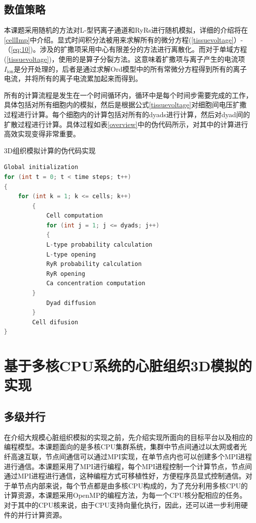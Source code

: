 \subsection{数值策略}
本课题采用随机的方法对L-型钙离子通道和RyRs进行随机模拟，详细的介绍将在\ref{cellImp}中介绍。显式时间积分法被用来求解所有的微分方程(\ref{tissuevoltage}）-（\ref{eq:10})。涉及的扩撒项采用中心有限差分的方法进行离散化。而对于单域方程(\ref{tissuevoltage})，使用的是算子分裂方法。这意味着扩撒项与离子产生的电流项$I_\mathrm{ion}$是分开处理的，后者是通过求解Ord模型中的所有常微分方程得到所有的离子电流，并将所有的离子电流累加起来而得到。

所有的计算流程是发生在一个时间循环内，循环中是每个时间步需要完成的工作，具体包括对所有细胞内的模拟，然后是根据公式\ref{tissuevoltage}对细胞间电压扩撒过程进行计算。每个细胞内的计算包括对所有的dyads进行计算，然后对dyad间的扩散过程进行计算。具体过程如表\ref{overview}中的伪代码所示，对其中的计算进行高效实现变得非常重要。

\begin{table}
\caption{3D组织模拟计算的伪代码实现}
\label{overview}
\begin{lstlisting}[language=C++, basicstyle=\ttfamily\footnotesize]
Global initialization
for (int t = 0; t < time steps; t++) 
{	
 	for (int k = 1; k <= cells; k++) 
    	{
      		Cell computation
      		for (int j = 1; j <= dyads; j++) 
      		{
			L-type probability calculation
			L-type opening	
			RyR probability calculation
			RyR opening
			Ca concentration computation
		}
      		Dyad diffusion 
      	}
    	Cell difusion 
}
\end{lstlisting}
\end{table}

\section{基于多核CPU系统的心脏组织3D模拟的实现}

 \subsection{多级并行}

在介绍大规模心脏组织模拟的实现之前，先介绍实现所面向的目标平台以及相应的编程模型。本课题面向的是多核CPU集群系统，集群中节点间通过以太网或者光纤高速互联，节点间通信可以通过MPI实现，在单节点内也可以创建多个MPI进程进行通信。本课题采用了MPI进行编程，每个MPI进程控制一个计算节点，节点间通过MPI进程进行通信，这种编程方式可移植性好，方便程序员显式控制通信。对于单节点内部来说，每个节点都是由多核CPU构成的，为了充分利用多核CPU的计算资源，本课题采用OpenMP的编程方法，为每一个CPU核分配相应的任务。对于其中的CPU核来说，由于CPU支持向量化执行，因此，还可以进一步利用硬件的并行计算资源。

